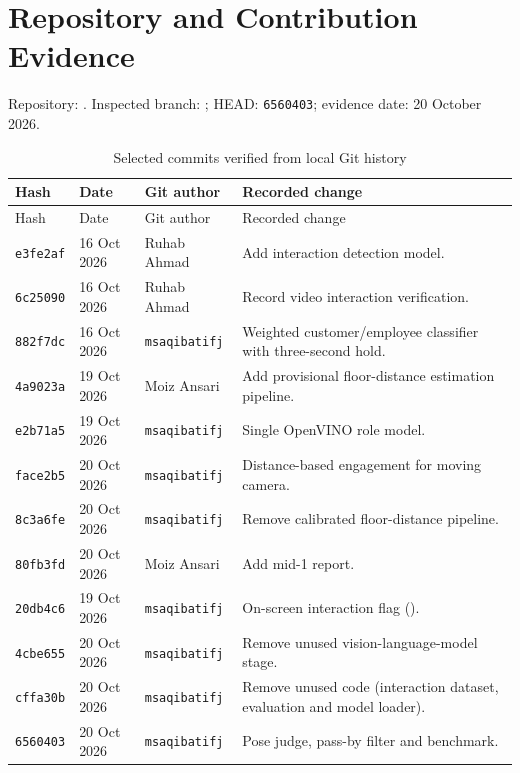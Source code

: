 \chapter{Repository and Contribution Evidence}
\label{app:repo}
Repository: . Inspected branch: ; HEAD: \texttt{6560403}; evidence date: 20 October 2026.

\begin{longtable}{P{0.13\textwidth}P{0.16\textwidth}P{0.18\textwidth}P{0.41\textwidth}}
\caption{Selected commits verified from local Git history}\\
\toprule
Hash & Date & Git author & Recorded change\\
\midrule
\endfirsthead
\toprule
Hash & Date & Git author & Recorded change\\
\midrule
\endhead
\texttt{e3fe2af} & 16 Oct 2026 & Ruhab Ahmad & Add interaction detection model.\\
\texttt{6c25090} & 16 Oct 2026 & Ruhab Ahmad & Record video interaction verification.\\
\texttt{882f7dc} & 16 Oct 2026 & \texttt{msaqibatifj} & Weighted customer/employee classifier with three-second hold.\\
\texttt{4a9023a} & 19 Oct 2026 & Moiz Ansari & Add provisional floor-distance estimation pipeline.\\
\texttt{e2b71a5} & 19 Oct 2026 & \texttt{msaqibatifj} & Single OpenVINO role model.\\
\texttt{face2b5} & 20 Oct 2026 & \texttt{msaqibatifj} & Distance-based engagement for moving camera.\\
\texttt{8c3a6fe} & 20 Oct 2026 & \texttt{msaqibatifj} & Remove calibrated floor-distance pipeline.\\
\texttt{80fb3fd} & 20 Oct 2026 & Moiz Ansari & Add mid-1 report.\\
\texttt{20db4c6} & 19 Oct 2026 & \texttt{msaqibatifj} & On-screen interaction flag ().\\
\texttt{4cbe655} & 20 Oct 2026 & \texttt{msaqibatifj} & Remove unused vision-language-model stage.\\
\texttt{cffa30b} & 20 Oct 2026 & \texttt{msaqibatifj} & Remove unused code (interaction dataset, evaluation and model loader).\\
\texttt{6560403} & 20 Oct 2026 & \texttt{msaqibatifj} & Pose judge, pass-by filter and benchmark.\\
\bottomrule
\end{longtable}

